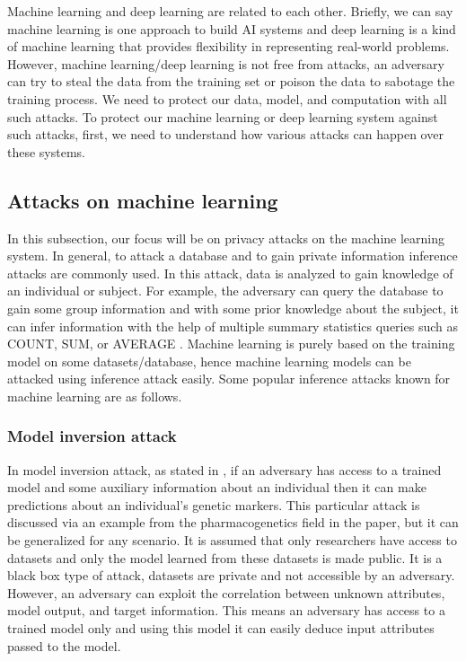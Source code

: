 Machine learning and deep learning are related to each other. Briefly, we can say machine learning is one approach to build AI systems and deep learning is a kind of machine learning that provides flexibility in representing real-world problems. However, machine learning/deep learning is not free from attacks, an adversary can try to steal the data from the training set or poison the data to sabotage the training process. We need to protect our data, model, and computation with all such attacks. To protect our machine learning or deep learning system against such attacks, first, we need to understand how various attacks can happen over these systems.

\subsection{Attacks on machine learning}
\label{sec:attackOnML}
In this subsection, our focus will be on privacy attacks on the machine learning system. In general, to attack a database and to gain private information inference attacks \cite{71} are commonly used. In this attack, data is analyzed to gain knowledge of an individual or subject. For example, the adversary can query the database to gain some group information and with some prior knowledge about the subject, it can infer information with the help of multiple summary statistics queries such as COUNT, SUM, or AVERAGE \cite{72}. Machine learning is purely based on the training model on some datasets/database, hence machine learning models can be attacked using inference attack easily. Some popular inference attacks known for machine learning are as follows.
\subsubsection{Model inversion attack}
In model inversion attack, as stated in \cite{17}, if an adversary has access to a trained model and some auxiliary information about an individual then it can make predictions about an individual's genetic markers. This particular attack is discussed via an example from the pharmacogenetics field in the paper, but it can be generalized for any scenario. It is assumed that only researchers have access to datasets and only the model learned from these datasets is made public. It is a black box type of attack, datasets are private and not accessible by an adversary. However, an adversary can exploit the correlation between unknown attributes, model output, and target information. This means an adversary has access to a trained model only and using this model it can easily deduce input attributes passed to the model.


